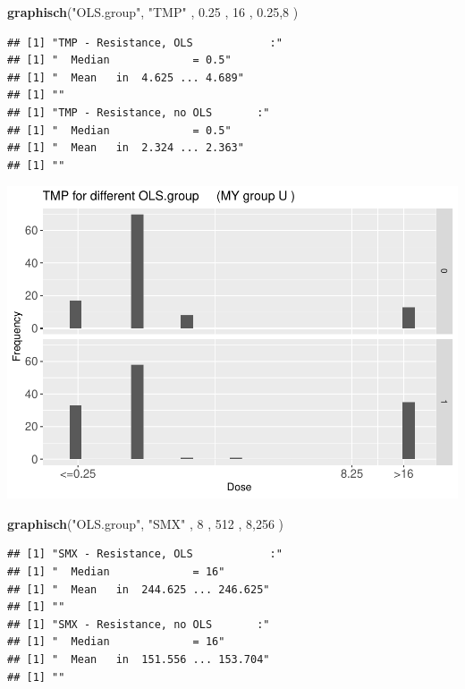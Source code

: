 \documentclass[
]{article}
\newenvironment{Shaded}{\begin{snugshade}}{\end{snugshade}}
\newcommand{\DecValTok}[1]{\textcolor[rgb]{0.00,0.00,0.81}{#1}}
\newcommand{\FloatTok}[1]{\textcolor[rgb]{0.00,0.00,0.81}{#1}}
\newcommand{\KeywordTok}[1]{\textcolor[rgb]{0.13,0.29,0.53}{\textbf{#1}}}
\newcommand{\NormalTok}[1]{#1}
\newcommand{\StringTok}[1]{\textcolor[rgb]{0.31,0.60,0.02}{#1}}
\begin{document}
\begin{Shaded}
\begin{Highlighting}[]
  \KeywordTok{graphisch}\NormalTok{(}\StringTok{"OLS.group"}\NormalTok{, }\StringTok{"TMP"}\NormalTok{ , }\FloatTok{0.25}\NormalTok{ ,  }\DecValTok{16}\NormalTok{   ,   }\FloatTok{0.25}\NormalTok{,}\DecValTok{8}\NormalTok{    ) }
\end{Highlighting}
\end{Shaded}

\begin{verbatim}
## [1] "TMP - Resistance, OLS            :"
## [1] "  Median             = 0.5"
## [1] "  Mean   in  4.625 ... 4.689"
## [1] ""
## [1] "TMP - Resistance, no OLS       :"
## [1] "  Median             = 0.5"
## [1] "  Mean   in  2.324 ... 2.363"
## [1] ""
\end{verbatim}

\includegraphics{Verteilungen_files/figure-latex/unnamed-chunk-29-1.pdf}

\begin{Shaded}
\begin{Highlighting}[]
  \KeywordTok{graphisch}\NormalTok{(}\StringTok{"OLS.group"}\NormalTok{, }\StringTok{"SMX"}\NormalTok{ , }\DecValTok{8}\NormalTok{    , }\DecValTok{512}\NormalTok{   ,   }\DecValTok{8}\NormalTok{,}\DecValTok{256}\NormalTok{   ) }
\end{Highlighting}
\end{Shaded}

\begin{verbatim}
## [1] "SMX - Resistance, OLS            :"
## [1] "  Median             = 16"
## [1] "  Mean   in  244.625 ... 246.625"
## [1] ""
## [1] "SMX - Resistance, no OLS       :"
## [1] "  Median             = 16"
## [1] "  Mean   in  151.556 ... 153.704"
## [1] ""
\end{verbatim}
\end{document}
